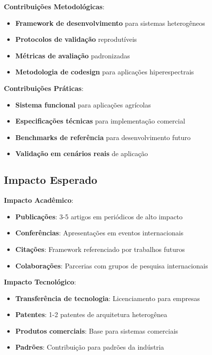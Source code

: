\textbf{Contribuições Metodológicas}:
\begin{itemize}
    \item \textbf{Framework de desenvolvimento} para sistemas heterogêneos
    \item \textbf{Protocolos de validação} reprodutíveis
    \item \textbf{Métricas de avaliação} padronizadas
    \item \textbf{Metodologia de codesign} para aplicações hiperespectrais
\end{itemize}

\textbf{Contribuições Práticas}:
\begin{itemize}
    \item \textbf{Sistema funcional} para aplicações agrícolas
    \item \textbf{Especificações técnicas} para implementação comercial
    \item \textbf{Benchmarks de referência} para desenvolvimento futuro
    \item \textbf{Validação em cenários reais} de aplicação
\end{itemize}

\subsection{Impacto Esperado}\label{subsec:impacto_esperado}

\textbf{Impacto Acadêmico}:
\begin{itemize}
    \item \textbf{Publicações}: 3-5 artigos em periódicos de alto impacto
    \item \textbf{Conferências}: Apresentações em eventos internacionais
    \item \textbf{Citações}: Framework referenciado por trabalhos futuros
    \item \textbf{Colaborações}: Parcerias com grupos de pesquisa internacionais
\end{itemize}

\textbf{Impacto Tecnológico}:
\begin{itemize}
    \item \textbf{Transferência de tecnologia}: Licenciamento para empresas
    \item \textbf{Patentes}: 1-2 patentes de arquitetura heterogênea
    \item \textbf{Produtos comerciais}: Base para sistemas comerciais
    \item \textbf{Padrões}: Contribuição para padrões da indústria
\end{itemize}


